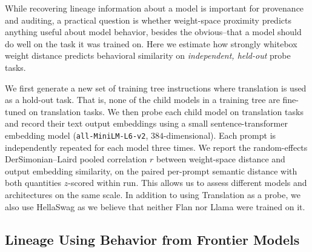\documentclass{article}
\theoremstyle{definition}
\theoremstyle{plain}
\begin{document}
While recovering lineage information about a model is important for
provenance and auditing, a practical question is whether weight-space
proximity predicts anything useful about model behavior, besides the obvious--that a model should do well on the task it was trained on. Here we estimate
how strongly whitebox weight distance predicts behavioral similarity on \textit{independent, held-out} probe tasks.

We first generate a new set of training tree instructions where translation is used as a hold-out task.  That is, none of the child models in a training tree are fine-tuned on translation tasks.  We then probe each child model on translation tasks and record their text output embeddings using a small sentence-transformer embedding model (\texttt{all-MiniLM-L6-v2}, $384$-dimensional).  Each prompt is independently repeated for each model three times.  We report the random-effects DerSimonian–Laird \citeyear{dersimonianlaird1986} pooled correlation $r$ between weight-space distance and output embedding similarity, on the paired per-prompt semantic distance with both quantities $z$-scored within run.  This allows us to assess different models and architectures on the same scale.  In addition to using Translation as a probe, we also use HellaSwag as we believe that neither Flan nor Llama were trained on it.





\subsection{Lineage Using Behavior from Frontier Models}
\label{sec:exp:blackbox}
\end{document}
